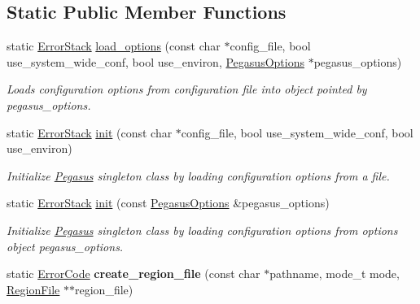 \subsection*{Static Public Member Functions}
\begin{DoxyCompactItemize}
\item 
static \hyperlink{classalps_1_1ErrorStack}{Error\+Stack} \hyperlink{classalps_1_1Pegasus_acc5a6c8a6a29fb20c52088fa01602c94}{load\+\_\+options} (const char $\ast$config\+\_\+file, bool use\+\_\+system\+\_\+wide\+\_\+conf, bool use\+\_\+environ, \hyperlink{structalps_1_1PegasusOptions}{Pegasus\+Options} $\ast$pegasus\+\_\+options)
\begin{DoxyCompactList}\small\item\em Loads configuration options from configuration file into object pointed by {\itshape pegasus\+\_\+options}. \end{DoxyCompactList}\item 
static \hyperlink{classalps_1_1ErrorStack}{Error\+Stack} \hyperlink{classalps_1_1Pegasus_a69e9d95ce8c4d350871dea4929fcf53b}{init} (const char $\ast$config\+\_\+file, bool use\+\_\+system\+\_\+wide\+\_\+conf, bool use\+\_\+environ)
\begin{DoxyCompactList}\small\item\em Initialize \hyperlink{classalps_1_1Pegasus}{Pegasus} singleton class by loading configuration options from a file. \end{DoxyCompactList}\item 
static \hyperlink{classalps_1_1ErrorStack}{Error\+Stack} \hyperlink{classalps_1_1Pegasus_a7dd3ac592651ab750897104e6006d310}{init} (const \hyperlink{structalps_1_1PegasusOptions}{Pegasus\+Options} \&pegasus\+\_\+options)\hypertarget{classalps_1_1Pegasus_a7dd3ac592651ab750897104e6006d310}{}\label{classalps_1_1Pegasus_a7dd3ac592651ab750897104e6006d310}

\begin{DoxyCompactList}\small\item\em Initialize \hyperlink{classalps_1_1Pegasus}{Pegasus} singleton class by loading configuration options from options object {\itshape pegasus\+\_\+options}. \end{DoxyCompactList}\item 
static \hyperlink{group__ERRORCODES_ga6263a3c9a0b8d36aea21cdd835ac99fe}{Error\+Code} {\bfseries create\+\_\+region\+\_\+file} (const char $\ast$pathname, mode\+\_\+t mode, \hyperlink{classalps_1_1RegionFile}{Region\+File} $\ast$$\ast$region\+\_\+file)\hypertarget{classalps_1_1Pegasus_a5dedaa1c31fa7bd9be92e9773b1f5a0a}{}\label{classalps_1_1Pegasus_a5dedaa1c31fa7bd9be92e9773b1f5a0a}


\end{DoxyCompactItemize}
